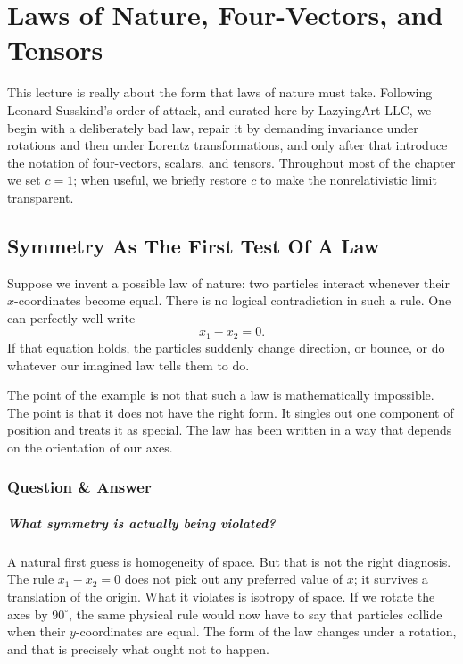 \chapter{Laws of Nature, Four-Vectors, and Tensors}

This lecture is really about the form that laws of nature must take. Following Leonard Susskind's order of attack, and curated here by LazyingArt LLC, we begin with a deliberately bad law, repair it by demanding invariance under rotations and then under Lorentz transformations, and only after that introduce the notation of four-vectors, scalars, and tensors. Throughout most of the chapter we set \(c=1\); when useful, we briefly restore \(c\) to make the nonrelativistic limit transparent.

\section{Symmetry As The First Test Of A Law}

Suppose we invent a possible law of nature: two particles interact whenever their \(x\)-coordinates become equal. There is no logical contradiction in such a rule. One can perfectly well write
\begin{equation}
x_1-x_2=0.
\end{equation}
If that equation holds, the particles suddenly change direction, or bounce, or do whatever our imagined law tells them to do.

The point of the example is not that such a law is mathematically impossible. The point is that it does not have the right form. It singles out one component of position and treats it as special. The law has been written in a way that depends on the orientation of our axes.

\subsection{Question \& Answer}

\paragraph{What symmetry is actually being violated?}

A natural first guess is homogeneity of space. But that is not the right diagnosis. The rule \(x_1-x_2=0\) does not pick out any preferred value of \(x\); it survives a translation of the origin. What it violates is isotropy of space. If we rotate the axes by \(90^\circ\), the same physical rule would now have to say that particles collide when their \(y\)-coordinates are equal. The form of the law changes under a rotation, and that is precisely what ought not to happen.

